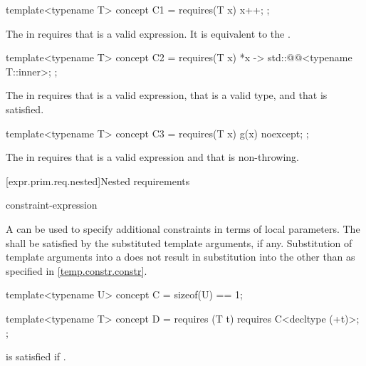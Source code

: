 \pnum
\begin{example}
\begin{codeblock}
template<typename T> concept C1 = requires(T x) {
  {x++};
};
\end{codeblock}
The  in 
requires that  is a valid expression.
It is equivalent to the 
.

\begin{codeblock}
template<typename T> concept C2 = requires(T x) {
  {*x} -> std::@@<typename T::inner>;
};
\end{codeblock}

The  in 
requires that  is a valid expression,
that  is a valid type, and
that  is satisfied.

\begin{codeblock}
template<typename T> concept C3 =
  requires(T x) {
    {g(x)} noexcept;
  };
\end{codeblock}

The  in 
requires that  is a valid expression and
that  is non-throwing.
\end{example}

[expr.prim.req.nested]{Nested requirements}
%

\begin{bnf}
\br
     constraint-expression \terminal{;}
\end{bnf}

\pnum
A  can be used
to specify additional constraints in terms of local parameters.
The 
shall be satisfied
by the substituted template arguments, if any.
Substitution of template arguments into a 
does not result in substitution into the 
other than as specified in \ref{temp.constr.constr}.
\begin{example}
\begin{codeblock}
template<typename U> concept C = sizeof(U) == 1;

template<typename T> concept D = requires (T t) {
  requires C<decltype (+t)>;
};
\end{codeblock}
 is satisfied if .
\end{example}

